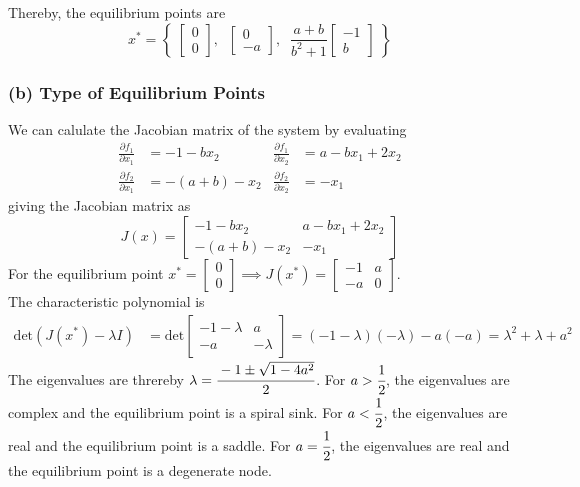 Thereby, the equilibrium points are
\begin{equation*}
    \boxed{
        x^* =
        \left \{ \;
        \begin{bmatrix}
            0 \\
            0
        \end{bmatrix}, \; \;
        \begin{bmatrix}
            0 \\
            -a
        \end{bmatrix}, \; \;
        \frac{a+b}{b^2 + 1}
        \begin{bmatrix}
            -1 \\
            b
        \end{bmatrix} \;
        \right \}
    }
\end{equation*}

\subsubsection*{(b) Type of Equilibrium Points}

We can calulate the Jacobian matrix of the system by evaluating
\begin{align*}
    \frac{\partial f_1}{\partial x_1}
     & =
    -1 - b x_2
     &
    \frac{\partial f_1}{\partial x_2}
     & =
    a - b x_1 + 2 x_2
    \\
    \frac{\partial f_2}{\partial x_1}
     & =
    -(a + b) - x_2
     &
    \frac{\partial f_2}{\partial x_2}
     & =
    -x_1
\end{align*}
giving the Jacobian matrix as
\begin{equation*}
    J(x) =
    \begin{bmatrix}
        -1 - b x_2     & a - b x_1 + 2 x_2 \\
        -(a + b) - x_2 & -x_1
    \end{bmatrix}
\end{equation*}
For the equilibrium point \( x^* = \begin{bmatrix} 0 \\ 0 \end{bmatrix} \implies J(x^*) =
\begin{bmatrix}
    -1 & a \\
    -a & 0
\end{bmatrix} \).\\
The characteristic polynomial is
\begin{align*}
    \text{det} \left( J(x^*) - \lambda I \right)
     & =
    \text{det}
    \begin{bmatrix}
        -1 - \lambda & a        \\
        -a           & -\lambda
    \end{bmatrix}
    =
    (-1 - \lambda)(-\lambda) - a(-a)
    =
    \lambda^2 + \lambda + a^2
\end{align*}
The eigenvalues are threreby \( \lambda = \cfrac{-1 \pm \sqrt{1 - 4a^2}}{2} \).
For \( a > \cfrac{1}{2} \), the eigenvalues are complex and the equilibrium point is a spiral sink.
For \( a < \cfrac{1}{2} \), the eigenvalues are real and the equilibrium point is a saddle.
For \( a = \cfrac{1}{2} \), the eigenvalues are real and the equilibrium point is a degenerate node.

